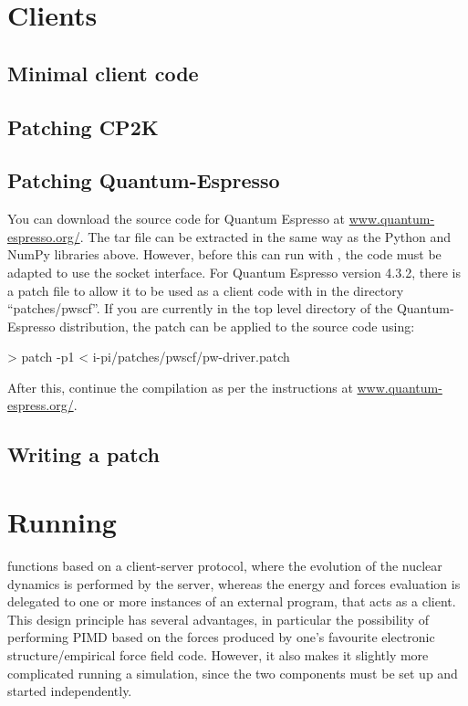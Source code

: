 \documentclass[11pt,english,fleqn]{report}
\newenvironment{code}{%
\footnotesize 
\verbatim
}{
\endverbatim
\normalsize
}
\begin{document}
\section{Clients}




\subsection{Minimal client code}


\subsection{Patching CP2K}



\subsection{Patching Quantum-Espresso}

You can download the source code for Quantum Espresso at \url{www.quantum-espresso.org/}.
The tar file can be extracted in the same way as the Python and NumPy
libraries above. However, before this can run with \ipi, the code
must be adapted to use the socket interface. For Quantum Espresso
version 4.3.2, there is a patch file to allow it to be used as a client
code with \ipi in the directory {}``patches/pwscf''. If you are
currently in the top level directory of the Quantum-Espresso distribution,
the patch can be applied to the source code using:

\begin{code}
> patch -p1 < i-pi/patches/pwscf/pw-driver.patch
\end{code}

After this, continue the compilation as per the instructions at \url{www.quantum-espress.org/}.


\subsection{Writing a patch}



\section{Running \ipi}

\ipi functions based on a client-server protocol, where the evolution of the nuclear dynamics
is performed by the \ipi server, whereas the energy and forces evaluation is delegated to 
one or more instances of an external program, that acts as a client. This design principle
has several advantages, in particular the possibility of performing PIMD based on the forces
produced by one's favourite electronic structure/empirical force field code. However, it 
also makes it slightly more complicated running a simulation, since the two components
must be set up and started independently.
\end{document}
